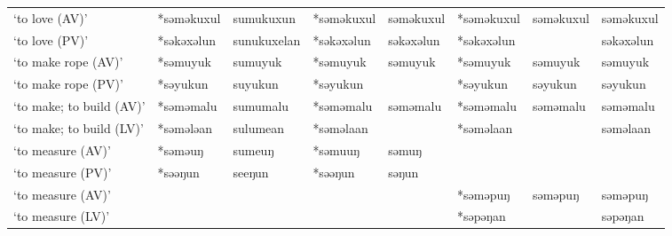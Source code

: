 \begin{landscape}
\begin{longtable}[c]{@{}p{3cm}<{\raggedright}p{2.75cm}<{\raggedright}p{2.75cm}<{\raggedright}p{2.75cm}<{\raggedright}p{2.75cm}<{\raggedright}p{2.75cm}<{\raggedright}p{2.75cm}<{\raggedright}p{2.75cm}<{\raggedright}@{}}
`to love (AV)'                                       & *səməkuxul         & sumukuxun                      & *səməkuxul         & səməkuxul                  & *səməkuxul       & səməkuxul                & səməkuxul                         \\
`to love (PV)'                                       & *səkəxəlun         & sunukuxelan                    & *səkəxəlun         & səkəxəlun                  & *səkəxəlun       &                          & səkəxəlun                         \\
`to make rope (AV)'                                  & *səmuyuk           & sumuyuk                        & *səmuyuk           & səmuyuk                    & *səmuyuk         & səmuyuk                  & səmuyuk                           \\
`to make rope (PV)'                                  & *səyukun           & suyukun                        & *səyukun           &                            & *səyukun         & səyukun                  & səyukun                           \\
`to make; to build (AV)'                             & *səməmalu          & sumumalu                       & *səməmalu          & səməmalu                   & *səməmalu        & səməmalu                 & səməmalu                          \\
`to make; to build (LV)'                             & *səmələan          & sulumean                       & *səməlaan          &                            & *səməlaan        &                          & səməlaan                          \\
`to measure (AV)'                                    & *səməuŋ            & sumeuŋ                         & *səmuuŋ            & səmuŋ                      &                  &                          &                                   \\
`to measure (PV)'                                    & *səəŋun            & seeŋun                         & *səəŋun            & səŋun                      &                  &                          &                                   \\
`to measure (AV)'                                    &                    &                                &                    &                            & *səməpuŋ         & səməpuŋ                  & səməpuŋ                           \\
`to measure (LV)'                                    &                    &                                &                    &                            & *səpəŋan         &                          & səpəŋan                           \\

\end{longtable}
\end{landscape}
